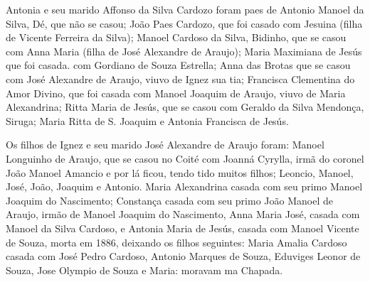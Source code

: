Antonia e seu marido Affonso da Silva Cardozo foram paes de Antonio Manoel da Silva, Dé, que não se casou; João Paes Cardozo, que foi casado com Jesuina (filha de Vicente Ferreira da Silva); Manoel Cardoso da Silva, Bidinho, que se casou com Anna Maria (filha de José Alexandre de Araujo); Maria Maximiana de Jesús que foi casada. com Gordiano de Souza Estrella; Anna das Brotas que se casou com José Alexandre de Araujo, viuvo de Ignez sua tia; Francisca Clementina do Amor Divino, que foi casada com Manoel Joaquim de Araujo, viuvo de Maria Alexandrina; Ritta Maria de Jesús, que se casou com Geraldo da Silva Mendonça, Siruga; Maria Ritta de S. Joaquim e Antonia Francisca de Jesús.

Os filhos de Ignez e seu marido José Alexandre de Araujo foram: Manoel Longuinho de Araujo, que se casou no Coité com Joanná Cyrylla, irmã do coronel João Manoel Amancio e por lá ficou, tendo tido muitos filhos; Leoncio, Manoel, José, João, Joaquim e Antonio. Maria Alexandrina casada com seu primo Manoel Joaquim do Nascimento; Constança casada com seu primo João Manoel de Araujo, irmão de Manoel Joaquim do Nascimento, Anna Maria José, casada com Manoel da Silva Cardoso, e Antonia Maria de Jesús, casada com Manoel Vicente de Souza, morta em 1886, deixando os filhos seguintes: Maria Amalia Cardoso casada com José Pedro Cardoso, Antonio Marques de Souza, Eduviges Leonor de Souza, Jose Olympio de Souza e Maria: moravam ma Chapada.

